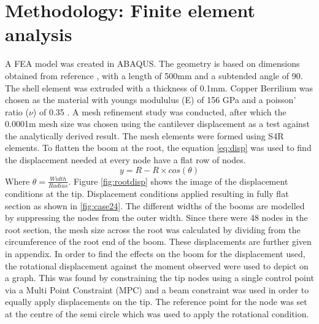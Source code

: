 \section{Methodology: Finite element analysis}
\label{sec:method}
A FEA model was created in ABAQUS. The geometry is based on dimensions obtained from reference \cite{Wu2018}, with a length of 500mm and a subtended angle of 90\degree. The shell element was extruded with a thickness of 0.1mm. Copper Berrilium was chosen as the material with youngs modululus (E) of 156 GPa \cite{Azomaterials} and a poisson' ratio ($\nu$) of 0.35 \cite{Azomaterials}. A mesh refinement study was conducted, after which the 0.0001m mesh size was chosen using the cantilever displacement as a test against the analytically derived result. The mesh elements were formed using S4R elements. To flatten the boom at the root, the equation \ref{eq:disp} was used to find the displacement needed at every node have a flat row of nodes.
\begin{equation}
  y=R-R\times cos(\theta)  
  \label{eq:disp}
\end{equation}
Where $\theta=\frac{Width}{Radius}$. 
Figure \ref{fig:rootdisp} shows the image of the displacement conditions at the tip. Displacement conditions applied resulting in fully flat section as shown in \ref{fig:case24}. The different widths of the booms are modelled by suppressing the nodes from the outer width. Since there were 48 nodes in the root section, the mesh size across the root was calculated by dividing from the circumference of the root end of the boom. 
These displacements are further given in appendix. In order to find the effects on the boom for the displacement used, the rotational displacement against the moment observed were used to depict on a graph. This was found by constraining the tip nodes using a single control point via a Multi Point Constraint (MPC) and a beam constraint was used in order to equally apply displacements on the tip. The reference point for the node was set at the centre of the semi circle which was used to apply the rotational condition.  

